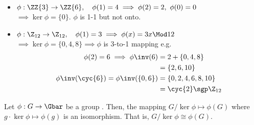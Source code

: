   \begin{examples}
    \begin{itemize}
      \item \(\phi:\ZZ{3}\to\ZZ{6}, \quad\phi(1) = 4 \implies \phi(2)=2,\ \phi(0)=0\) \\
      \(\implies\ker\phi = \{0\}\). \(\phi\) is 1-1 but not onto.
      \item \(\phi:\Z_{12}\to\Z_{12}, \quad \phi(1)=3 \implies \phi(x)=3x \Mod 12\) \\
      \(\implies \ker\phi = \{0, 4, 8\}\implies \phi\) is 3-to-1 mapping
      e.g. \begin{align*}
        \phi(2) = 6\implies \phi\inv(6) &= 2+\{0, 4, 8\} \\
        &= \{2,6,10\} \\
        \phi\inv(\cyc{6}) = \phi\inv(\{0,6\}) &= \{0,2,4,6,8,10\} \\
        &= \cyc{2} \sgp \Z_{12}
      \end{align*}
    \end{itemize}
  \end{examples}

  \begin{theorem}
      Let \(\phi:G\to\Gbar\) be a group \homo. Then, the mapping \(G/\ker\phi\mapsto \phi(G)\) where \(g\cdot\ker\phi\mapsto \phi(g)\) is an isomorphism. That is, \(G/\ker\phi\cong \phi(G)\).
  \end{theorem}
